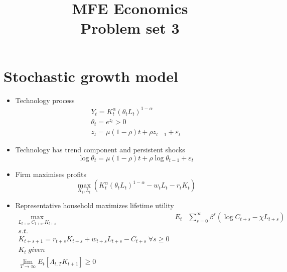 \documentclass[authoryear,11pt]{elsarticle}
\begin{document}
\begin{frontmatter}
\title{MFE Economics\\Problem set 3}
\end{frontmatter}


\section{Stochastic growth model}

\begin{itemize}
\item Technology process
\begin{gather*}
Y_{t}=K_{t}^{\alpha }\left( \theta _{t}L_{t}\right) ^{1-\alpha } \\
\theta _{t}=e^{z_{t}}>0 \\
z_{t}=\mu (1-\rho )t+\rho z_{t-1}+\varepsilon _{t}
\end{gather*}
\item Technology has trend component and persistent shocks
\begin{equation*}
\log \theta _{t}=\mu (1-\rho )t+\rho \log \theta _{t-1}+\varepsilon _{t}
\end{equation*}
\item	Firm maximises profits
\begin{equation*}
\underset{K_{t},L_{t}}{\max }\left( K_{t}^{\alpha }\left(\theta_{t}L_{t}\right) ^{1-\alpha }-w_{t}L_{t}-r_{t}K_{t}\right)
\end{equation*}
\item	Representative household maximizes lifetime utility
\begin{eqnarray*}
\underset{L_{t+s},C_{t+s}, K_{t+s}}{\max } &E_{t}& \sum\limits_{s=0}^{\infty} \beta^{s} (\log{C_{t+s}} - \chi L_{t+s}) \\
s.t.&& \\
K_{t+s+1} = r_{t+s} K_{t+s} + w_{t+s} L_{t+s} - C_{t+s} \; \forall s\geq 0 &&\\
K_{t} \; given&& \\
 \lim_{T\rightarrow \infty} E_{t} [\Lambda_{t,T} K_{t+1} ] \geq 0&&
\end{eqnarray*}
\end{itemize}
\end{document}
